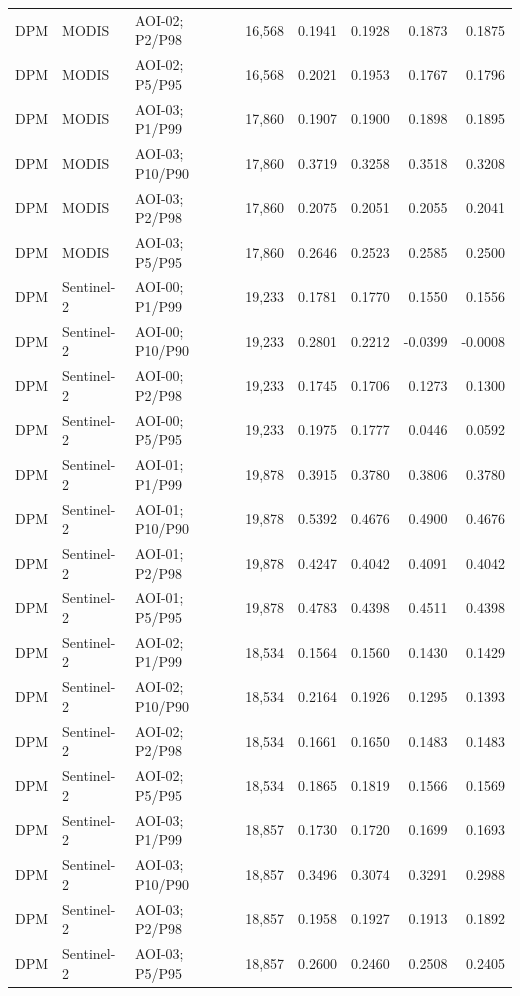 \begin{landscape}
\begin{longtable}{lllrrrrr}
DPM & MODIS & AOI-02; P2/P98 & 16,568 & 0.1941 & 0.1928 & 0.1873 & 0.1875 \\
DPM & MODIS & AOI-02; P5/P95 & 16,568 & 0.2021 & 0.1953 & 0.1767 & 0.1796 \\
DPM & MODIS & AOI-03; P1/P99 & 17,860 & 0.1907 & 0.1900 & 0.1898 & 0.1895 \\
DPM & MODIS & AOI-03; P10/P90 & 17,860 & 0.3719 & 0.3258 & 0.3518 & 0.3208 \\
DPM & MODIS & AOI-03; P2/P98 & 17,860 & 0.2075 & 0.2051 & 0.2055 & 0.2041 \\
DPM & MODIS & AOI-03; P5/P95 & 17,860 & 0.2646 & 0.2523 & 0.2585 & 0.2500 \\
DPM & Sentinel-2 & AOI-00; P1/P99 & 19,233 & 0.1781 & 0.1770 & 0.1550 & 0.1556 \\
DPM & Sentinel-2 & AOI-00; P10/P90 & 19,233 & 0.2801 & 0.2212 & -0.0399 & -0.0008 \\
DPM & Sentinel-2 & AOI-00; P2/P98 & 19,233 & 0.1745 & 0.1706 & 0.1273 & 0.1300 \\
DPM & Sentinel-2 & AOI-00; P5/P95 & 19,233 & 0.1975 & 0.1777 & 0.0446 & 0.0592 \\
DPM & Sentinel-2 & AOI-01; P1/P99 & 19,878 & 0.3915 & 0.3780 & 0.3806 & 0.3780 \\
DPM & Sentinel-2 & AOI-01; P10/P90 & 19,878 & 0.5392 & 0.4676 & 0.4900 & 0.4676 \\
DPM & Sentinel-2 & AOI-01; P2/P98 & 19,878 & 0.4247 & 0.4042 & 0.4091 & 0.4042 \\
DPM & Sentinel-2 & AOI-01; P5/P95 & 19,878 & 0.4783 & 0.4398 & 0.4511 & 0.4398 \\
DPM & Sentinel-2 & AOI-02; P1/P99 & 18,534 & 0.1564 & 0.1560 & 0.1430 & 0.1429 \\
DPM & Sentinel-2 & AOI-02; P10/P90 & 18,534 & 0.2164 & 0.1926 & 0.1295 & 0.1393 \\
DPM & Sentinel-2 & AOI-02; P2/P98 & 18,534 & 0.1661 & 0.1650 & 0.1483 & 0.1483 \\
DPM & Sentinel-2 & AOI-02; P5/P95 & 18,534 & 0.1865 & 0.1819 & 0.1566 & 0.1569 \\
DPM & Sentinel-2 & AOI-03; P1/P99 & 18,857 & 0.1730 & 0.1720 & 0.1699 & 0.1693 \\
DPM & Sentinel-2 & AOI-03; P10/P90 & 18,857 & 0.3496 & 0.3074 & 0.3291 & 0.2988 \\
DPM & Sentinel-2 & AOI-03; P2/P98 & 18,857 & 0.1958 & 0.1927 & 0.1913 & 0.1892 \\
DPM & Sentinel-2 & AOI-03; P5/P95 & 18,857 & 0.2600 & 0.2460 & 0.2508 & 0.2405 \\

\end{longtable}
\end{landscape}
